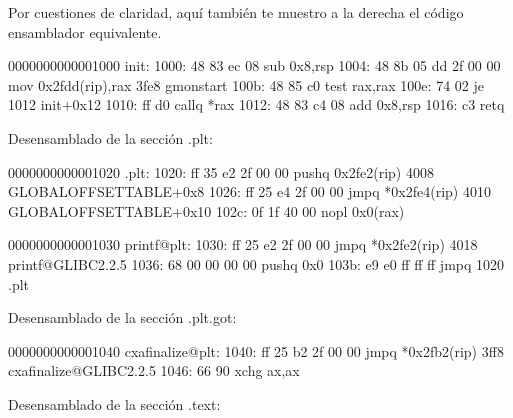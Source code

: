 \documentclass[letterpaper,10pt,spanish]{sphinxmanual}
\begin{document}
\sphinxAtStartPar
Por cuestiones de claridad, aquí también te muestro a la derecha el código ensamblador equivalente.
\def\sphinxLiteralBlockLabel{\label{\detokenize{obtencion_del_codigo:id4}}}
\begin{sphinxVerbatim}[commandchars=\\\{\}]
0000000000001000 \PYGZlt{}\PYGZus{}init\PYGZgt{}:
    1000:   48 83 ec 08             sub    \PYGZdl{}0x8,\PYGZpc{}rsp
    1004:   48 8b 05 dd 2f 00 00    mov    0x2fdd(\PYGZpc{}rip),\PYGZpc{}rax        \PYGZsh{} 3fe8 \PYGZlt{}\PYGZus{}\PYGZus{}gmon\PYGZus{}start\PYGZus{}\PYGZus{}\PYGZgt{}
    100b:   48 85 c0                test   \PYGZpc{}rax,\PYGZpc{}rax
    100e:   74 02                   je     1012 \PYGZlt{}\PYGZus{}init+0x12\PYGZgt{}
    1010:   ff d0                   callq  *\PYGZpc{}rax
    1012:   48 83 c4 08             add    \PYGZdl{}0x8,\PYGZpc{}rsp
    1016:   c3                      retq

Desensamblado de la sección .plt:

0000000000001020 \PYGZlt{}.plt\PYGZgt{}:
    1020:   ff 35 e2 2f 00 00       pushq  0x2fe2(\PYGZpc{}rip)        \PYGZsh{} 4008 \PYGZlt{}\PYGZus{}GLOBAL\PYGZus{}OFFSET\PYGZus{}TABLE\PYGZus{}+0x8\PYGZgt{}
    1026:   ff 25 e4 2f 00 00       jmpq   *0x2fe4(\PYGZpc{}rip)        \PYGZsh{} 4010 \PYGZlt{}\PYGZus{}GLOBAL\PYGZus{}OFFSET\PYGZus{}TABLE\PYGZus{}+0x10\PYGZgt{}
    102c:   0f 1f 40 00             nopl   0x0(\PYGZpc{}rax)

0000000000001030 \PYGZlt{}printf@plt\PYGZgt{}:
    1030:   ff 25 e2 2f 00 00       jmpq   *0x2fe2(\PYGZpc{}rip)        \PYGZsh{} 4018 \PYGZlt{}printf@GLIBC\PYGZus{}2.2.5\PYGZgt{}
    1036:   68 00 00 00 00          pushq  \PYGZdl{}0x0
    103b:   e9 e0 ff ff ff          jmpq   1020 \PYGZlt{}.plt\PYGZgt{}

Desensamblado de la sección .plt.got:

0000000000001040 \PYGZlt{}\PYGZus{}\PYGZus{}cxa\PYGZus{}finalize@plt\PYGZgt{}:
    1040:   ff 25 b2 2f 00 00       jmpq   *0x2fb2(\PYGZpc{}rip)        \PYGZsh{} 3ff8 \PYGZlt{}\PYGZus{}\PYGZus{}cxa\PYGZus{}finalize@GLIBC\PYGZus{}2.2.5\PYGZgt{}
    1046:   66 90                   xchg   \PYGZpc{}ax,\PYGZpc{}ax

Desensamblado de la sección .text:


\end{sphinxVerbatim}
\end{document}
